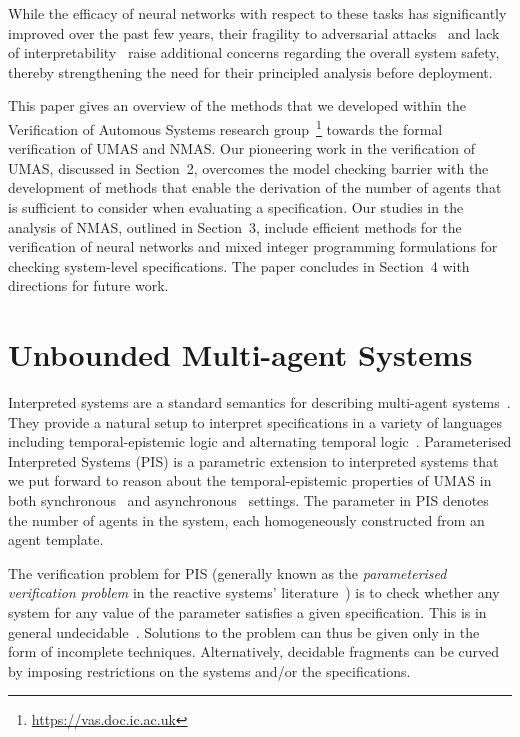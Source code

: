 \documentclass{article}
\begin{document}
While the efficacy of neural networks with respect to these tasks has
significantly improved over the past few years,  their fragility to adversarial
attacks~\cite{Szegedy+14} and lack of interpretability~\cite{VelizKim17} raise 
additional concerns regarding the overall system safety, thereby strengthening
the need for their principled analysis before deployment.

This paper gives an overview of the methods that we developed within the
Verification of Automous Systems research
group~\footnote{\url{https://vas.doc.ic.ac.uk}} towards the formal verification
of UMAS and NMAS.  Our pioneering work in the verification of UMAS, discussed in
Section~2, overcomes the model checking barrier with the development of methods
that enable the derivation of the number of agents that is sufficient to
consider when evaluating a specification. Our studies in the analysis of NMAS,
outlined in Section~3, include efficient methods for the verification of neural
networks and mixed integer programming formulations for checking system-level
specifications.  The paper concludes in Section~4 with directions for
future work.


\section{Unbounded Multi-agent Systems}

Interpreted systems are a standard semantics for describing multi-agent
systems~\cite{Fagin+95a}.  They provide a natural setup to interpret
specifications in a variety of languages including temporal-epistemic logic and
alternating temporal logic~\cite{Fagin+95b,LomuscioRaimondi06c}. Parameterised
Interpreted Systems (PIS)  is a parametric extension to interpreted systems
that we put forward  to reason about the temporal-epistemic properties of UMAS
in both synchronous~\cite{KouvarosLomuscio15b} and
asynchronous~\cite{KouvarosLomuscio16a} settings.   The parameter in PIS denotes
the number of agents in the system, each homogeneously constructed from an agent
template. 

The verification problem for PIS (generally known as the {\em parameterised
verification problem} in the reactive systems' literature~\cite{Bloem+15}) is to
check whether any system for any value of the parameter satisfies a given
specification.  This is in general undecidable~\cite{KouvarosLomuscio16a}.
Solutions to the problem can thus be given only in the form of incomplete techniques.
Alternatively, decidable fragments can be curved by imposing
restrictions on the systems and/or the specifications.  
\end{document}
